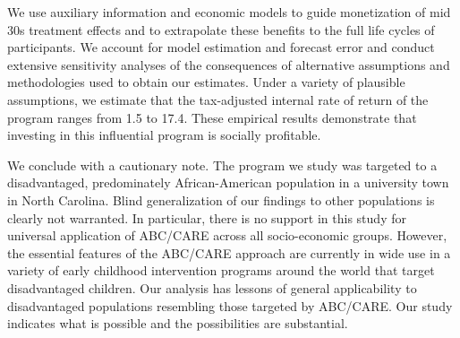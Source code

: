 We use auxiliary information and economic models to guide monetization of mid 30s treatment effects and to extrapolate these benefits to the full life cycles of participants. We account for model estimation and forecast error and conduct extensive sensitivity analyses of the consequences of alternative assumptions and methodologies used to obtain our estimates. Under a variety of plausible assumptions, we estimate that the tax-adjusted internal rate of return of the program ranges from 1.5 to 17.4. These empirical results demonstrate that investing in this influential program is socially profitable.

We conclude with a cautionary note. The program we study was targeted to a disadvantaged, predominately African-American population in a university town in North Carolina. Blind generalization of our findings to other populations is clearly not warranted. In particular, there is no support in this study for universal application of ABC/CARE across all socio-economic groups. However, the essential features of the ABC/CARE approach are currently in wide use in a variety of early childhood intervention programs around the world that target disadvantaged children. Our analysis has lessons of general applicability to disadvantaged populations resembling those targeted by ABC/CARE. Our study indicates what is possible and the possibilities are substantial.

\singlespace





